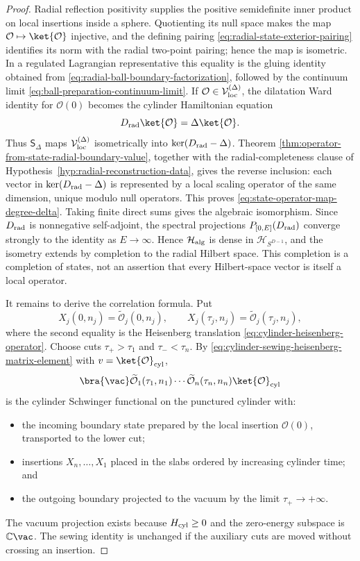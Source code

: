 \begin{proof}
Radial reflection positivity supplies the positive semidefinite inner product
on local insertions inside a sphere.  Quotienting its null space makes the map
\(\mathcal O\mapsto\ket{\mathcal O}\) injective, and the defining pairing
\eqref{eq:radial-state-exterior-pairing} identifies its norm with the radial
two-point pairing; hence the map is isometric.  In a regulated Lagrangian
representative this equality is the gluing identity obtained from
\eqref{eq:radial-ball-boundary-factorization}, followed by the continuum
limit \eqref{eq:ball-preparation-continuum-limit}.  If
\(\mathcal O\in\mathcal V_{\rm loc}^{(\Delta)}\), the dilatation Ward identity
for \(\mathcal O(0)\) becomes the cylinder Hamiltonian equation
\[
  D_{\rm rad}\ket{\mathcal O}=\Delta\ket{\mathcal O}.
\]
Thus \(\mathsf S_\Delta\) maps
\(\mathcal V_{\rm loc}^{(\Delta)}\) isometrically into
\(\ker(D_{\rm rad}-\Delta)\).  Theorem
\ref{thm:operator-from-state-radial-boundary-value}, together with the
radial-completeness clause of
Hypothesis~\ref{hyp:radial-reconstruction-data}, gives the reverse inclusion:
each vector in \(\ker(D_{\rm rad}-\Delta)\) is represented by a local scaling
operator of the same dimension, unique modulo null operators.  This proves
\eqref{eq:state-operator-map-degree-delta}.  Taking finite direct sums gives
the algebraic isomorphism.  Since \(D_{\rm rad}\) is nonnegative self-adjoint,
the spectral projections \(P_{[0,E]}(D_{\rm rad})\) converge strongly to the
identity as \(E\to\infty\).  Hence \(\mathcal H_{\rm alg}\) is dense in
\(\mathcal H_{S^{D-1}}\), and the isometry extends by completion to the radial
Hilbert space.  This completion is a completion of states, not an assertion
that every Hilbert-space vector is itself a local operator.

It remains to derive the correlation formula.  Put
\[
  X_j(0,n_j)=\widetilde{\mathcal O}_j(0,n_j),
  \qquad
  X_j(\tau_j,n_j)=
  \widetilde{\mathcal O}_j(\tau_j,n_j),
\]
where the second equality is the Heisenberg translation
\eqref{eq:cylinder-heisenberg-operator}.  Choose cuts
\(\tau_+>\tau_1\) and \(\tau_-<\tau_n\).  By
\eqref{eq:cylinder-sewing-heisenberg-matrix-element} with
\(v=\ket{\mathcal O}_{\rm cyl}\),
\[
  \bra{\vac}
  \widetilde{\mathcal O}_1(\tau_1,n_1)\cdots
  \widetilde{\mathcal O}_n(\tau_n,n_n)
  \ket{\mathcal O}_{\rm cyl}
\]
is the cylinder Schwinger functional on the punctured cylinder with:
\begin{itemize}
\item the incoming boundary state prepared by the local insertion
  \(\mathcal O(0)\), transported to the lower cut;
\item insertions \(X_n,\ldots,X_1\) placed in the slabs ordered by increasing
  cylinder time; and
\item the outgoing boundary projected to the vacuum by the limit
  \(\tau_+\to+\infty\).
\end{itemize}
The vacuum projection exists because \(H_{\rm cyl}\ge0\) and the zero-energy
subspace is \(\mathbb C\vac\).  The sewing identity is unchanged if the
auxiliary cuts are moved without crossing an insertion.


\end{proof}
